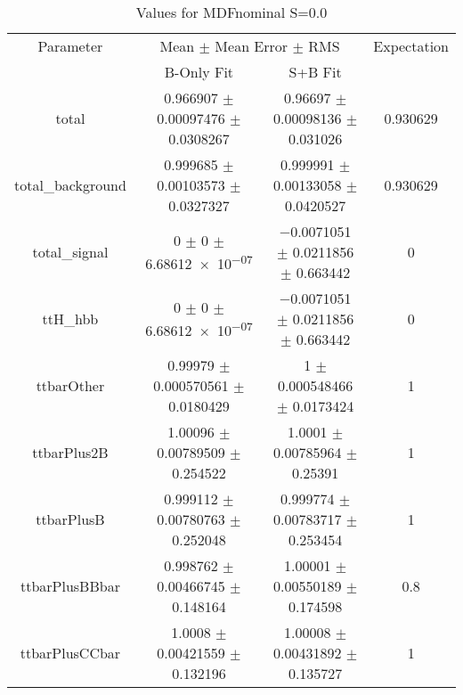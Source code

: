 \begin{table}
\centering
\caption{Values for MDFnominal S=0.0}
\begin{tabular}{cccc}
\toprule
Parameter & \multicolumn{2}{c}{Mean $\pm$ Mean Error $\pm$ RMS} & Expectation\\
 & B-Only Fit & S+B Fit & \\
\midrule
total & \num{0.966907} $\pm$ \num{0.00097476} $\pm$ \num{0.0308267} & \num{0.96697} $\pm$ \num{0.00098136} $\pm$ \num{0.031026} & \num{0.930629}\\
total\_background & \num{0.999685} $\pm$ \num{0.00103573} $\pm$ \num{0.0327327} & \num{0.999991} $\pm$ \num{0.00133058} $\pm$ \num{0.0420527} & \num{0.930629}\\
total\_signal & \num{0} $\pm$ \num{0} $\pm$ \num{6.68612e-07} & \num{-0.0071051} $\pm$ \num{0.0211856} $\pm$ \num{0.663442} & \num{0}\\
ttH\_hbb & \num{0} $\pm$ \num{0} $\pm$ \num{6.68612e-07} & \num{-0.0071051} $\pm$ \num{0.0211856} $\pm$ \num{0.663442} & \num{0}\\
ttbarOther & \num{0.99979} $\pm$ \num{0.000570561} $\pm$ \num{0.0180429} & \num{1} $\pm$ \num{0.000548466} $\pm$ \num{0.0173424} & \num{1}\\
ttbarPlus2B & \num{1.00096} $\pm$ \num{0.00789509} $\pm$ \num{0.254522} & \num{1.0001} $\pm$ \num{0.00785964} $\pm$ \num{0.25391} & \num{1}\\
ttbarPlusB & \num{0.999112} $\pm$ \num{0.00780763} $\pm$ \num{0.252048} & \num{0.999774} $\pm$ \num{0.00783717} $\pm$ \num{0.253454} & \num{1}\\
ttbarPlusBBbar & \num{0.998762} $\pm$ \num{0.00466745} $\pm$ \num{0.148164} & \num{1.00001} $\pm$ \num{0.00550189} $\pm$ \num{0.174598} & \num{0.8}\\
ttbarPlusCCbar & \num{1.0008} $\pm$ \num{0.00421559} $\pm$ \num{0.132196} & \num{1.00008} $\pm$ \num{0.00431892} $\pm$ \num{0.135727} & \num{1}\\
\bottomrule
\end{tabular}
\end{table}